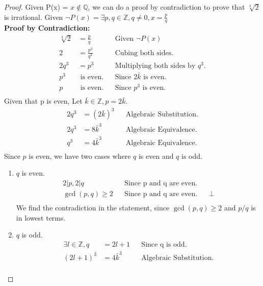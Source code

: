 \documentclass{article}
\newcommand{\AllIntegers}{\mathbb{Z}}
\newcommand{\AllRationals}{\mathbb{Q}}
\begin{document}
\begin{proof}
    Given P(x) = \(x \notin \AllRationals\), we can do a proof by contradiction to prove that \(\sqrt[3]{2}\) is irrational. Given \(\neg P(x) = \exists p,q \in \AllIntegers, q\neq 0, x = \frac{p}{q}\)\\
    \textbf{Proof by Contradiction:}\\
    \begin{align*}
        \sqrt[3]{2} &= \frac{p}{q} && \text{Given } \neg P(x)\\
        2 &= \frac{p^3}{q^3} && \text{Cubing both sides.}\\
        2q^3 &= p^3 && \text{Multiplying both sides by } q^3.\\
        p^3 &\text{ is even.} && \text{Since } 2\bar{k} \text{ is even.}\\
        p &\text{ is even.} && \text{Since } p^3 \text{ is even.}\\
    \end{align*}
    Given that p is even, Let \(\bar{k} \in \AllIntegers, p=2\bar{k}\).
    \begin{align*}
        2q^3&= (2\bar{k})^3 && \text{Algebraic Substitution.}\\
        2q^3&= 8\bar{k}^3 && \text{Algebraic Equivalence.}\\
        q^3&= 4\bar{k}^3 && \text{Algebraic Equivalence.}\\
    \end{align*}
    Since \(p\) is even, we have two cases where \(q\) is even and \(q\) is odd.\\
    \begin{enumerate}
        \item \(q\) is even.\\
        \begin{align*}
            2|p, 2|q&&\text{Since p and q are even.}\\
            \gcd(p,q) \geq 2&&\text{Since p and q are even.}
            &&\bot\\
        \end{align*}
        We find the contradiction in the statement, since \(\gcd(p,q) \geq 2\) and \(p/q\) is in lowest terms.
        \item \(q\) is odd.\\
        \begin{align*}
            \exists l \in \AllIntegers, q &= 2l + 1&&\text{Since q is odd.}\\
            (2l + 1)^3 &= 4\bar{k}^3&&\text{Algebraic Substitution.}\\

\end{align*}
\end{enumerate}
\end{proof}
\end{document}

